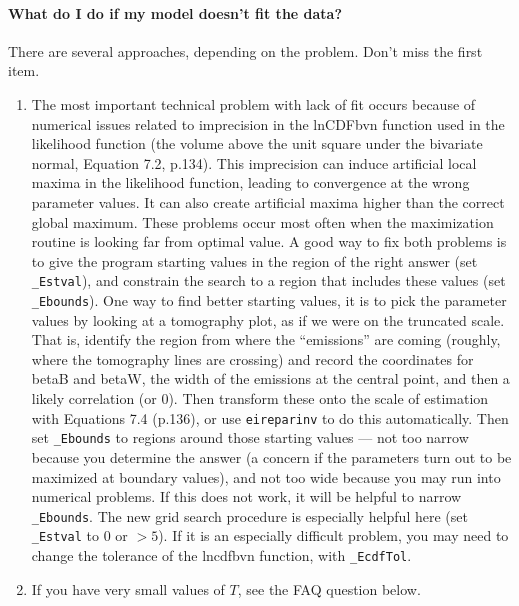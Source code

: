 \documentclass[11pt,titlepage]{article}
\begin{document}
\paragraph{What do I do if my model doesn't fit the data?}  There are
several approaches, depending on the problem.  Don't miss the first
item.
\begin{enumerate}
\item The most important technical problem with lack of fit occurs
  because of numerical issues related to imprecision in the lnCDFbvn
  function used in the likelihood function (the volume above the unit
  square under the bivariate normal, Equation 7.2, p.134).  This
  imprecision can induce artificial local maxima in the likelihood
  function, leading to convergence at the wrong parameter values.  It
  can also create artificial maxima higher than the correct global
  maximum.  These problems occur most often when the maximization
  routine is looking far from optimal value.  A good way to fix both
  problems is to give the program starting values in the region of the
  right answer (set \texttt{\_Estval}), and constrain the search to a
  region that includes these values (set \texttt{\_Ebounds}).  One way
  to find better starting values, it is to pick the parameter values
  by looking at a tomography plot, as if we were on the truncated
  scale.  That is, identify the region from where the ``emissions''
  are coming (roughly, where the tomography lines are crossing) and
  record the coordinates for betaB and betaW, the width of the
  emissions at the central point, and then a likely correlation (or
  0).  Then transform these onto the scale of estimation with
  Equations 7.4 (p.136), or use \texttt{eireparinv} to do this
  automatically.  Then set \texttt{\_Ebounds} to regions around those
  starting values --- not too narrow because you determine the answer
  (a concern if the parameters turn out to be maximized at boundary
  values), and not too wide because you may run into numerical
  problems.  If this does not work, it will be helpful to narrow
  \texttt{\_Ebounds}.  The new grid search procedure is especially
  helpful here (set \texttt{\_Estval} to 0 or $>5$).  If it is an
  especially difficult problem, you may need to change the tolerance
  of the lncdfbvn function, with \texttt{\_EcdfTol}.

\item If you have very small values of $T$, see the FAQ question
  below.


\end{enumerate}
\end{document}
